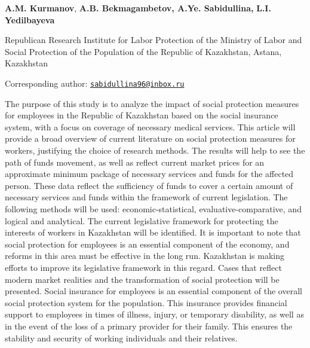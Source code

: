 

\begin{articleheader}


{\bfseries A.M. Kurmanov}, {\bfseries A.B. Bekmagambetov, A.Ye.
Sabidullina\textsuperscript{\envelope },} {\bfseries L.I. Yedilbayeva}
\end{articleheader}
\begin{affiliation}

Republican Research Institute for Labor Protection of the Ministry of
Labor and Social Protection of the Population of the Republic of
Kazakhstan, Astana, Kazakhstan

\raggedright{\bfseries \textsuperscript{\envelope }}Corresponding author:
\href{mailto:sabidullina96@inbox.ru}{\nolinkurl{sabidullina96@inbox.ru}}
\end{affiliation}

The purpose of this study is to analyze the impact of social protection
measures for employees in the Republic of Kazakhstan based on the social
insurance system, with a focus on coverage of necessary medical
services. This article will provide a broad overview of current
literature on social protection measures for workers, justifying the
choice of research methods. The results will help to see the path of
funds movement, as well as reflect current market prices for an
approximate minimum package of necessary services and funds for the
affected person. These data reflect the sufficiency of funds to cover a
certain amount of necessary services and funds within the framework of
current legislation. The following methods will be used:
economic-statistical, evaluative-comparative, and logical and
analytical. The current legislative framework for protecting the
interests of workers in Kazakhstan will be identified. It is important
to note that social protection for employees is an essential component
of the economy, and reforms in this area must be effective in the long
run. Kazakhstan is making efforts to improve its legislative framework
in this regard. Cases that reflect modern market realities and the
transformation of social protection will be presented. Social insurance
for employees is an essential component of the overall social protection
system for the population. This insurance provides financial support to
employees in times of illness, injury, or temporary disability, as well
as in the event of the loss of a primary provider for their family. This
ensures the stability and security of working individuals and their
relatives.

